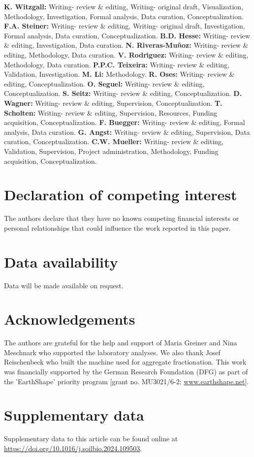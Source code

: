    \textbf{K. Witzgall:} Writing- review \& editing, Writing- original draft, Visualization, Methodology, Investigation, Formal analysis, Data curation, Conceptualization.
    \textbf{F.A. Steiner:} Writing- review \& editing, Writing- original draft, Investigation, Formal analysis, Data curation, Conceptualization.
    \textbf{B.D. Hesse:} Writing- review \& editing, Investigation, Data curation.
    \textbf{N. Riveras-Mu{\~n}oz:} Writing- review \& editing, Methodology, Data curation.
    \textbf{V. Rodr{\'\i}guez:} Writing- review \& editing, Methodology, Data curation. %
    \textbf{P.P.C. Teixeira:} Writing- review \& editing, Validation, Investigation.
    \textbf{M. Li:} Methodology.
    \textbf{R. Oses:} Writing- review \& editing, Conceptualization.
    \textbf{O. Seguel:} Writing- review \& editing, Conceptualization.
    \textbf{S. Seitz:} Writing- review \& editing, Conceptualization.
    \textbf{D. Wagner:} Writing- review \& editing, Supervision, Conceptualization.
    \textbf{T. Scholten:} Writing- review \& editing, Supervision, Resources, Funding acquisition, Conceptualization.
    \textbf{F. Buegger:} Writing- review \& editing, Formal analysis, Data curation.
    \textbf{G. Angst:} Writing- review \& editing, Supervision, Data curation, Conceptualization.
    \textbf{C.W. Mueller:} Writing- review \& editing, Validation, Supervision, Project administration, Methodology, Funding acquisition, Conceptualization.


\section*{Declaration of competing interest}

The authors declare that they have no known competing financial interests or personal relationships that could influence the work reported in this paper.

\section*{Data availability}

Data will be made available on request.

\section*{Acknowledgements}

The authors are grateful for the help and support of Maria Greiner and Nina Meschnark who supported the laboratory analyses. 
We also thank Josef Reischenbeck who built the machine used for aggregate fractionation. This work was financially supported by the German Research Foundation (DFG) as part of the 'EarthShape' priority program [grant no. MU3021/6-2; \url{www.earthshape.net}].

\section*{Supplementary data}

Supplementary data to this article can be found online at \url{https://doi.org/10.1016/j.soilbio.2024.109503}.


